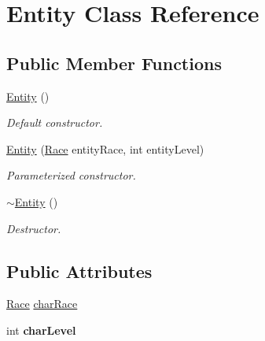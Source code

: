 \hypertarget{class_entity}{}\section{Entity Class Reference}
\label{class_entity}
\subsection*{Public Member Functions}
\begin{DoxyCompactItemize}
\item 
\hypertarget{class_entity_a980f368aa07ce358583982821533a54a}{}\label{class_entity_a980f368aa07ce358583982821533a54a} 
\hyperlink{class_entity_a980f368aa07ce358583982821533a54a}{Entity} ()
\begin{DoxyCompactList}\small\item\em Default constructor. \end{DoxyCompactList}\item 
\hypertarget{class_entity_aaed442bc1dcf2d646827d8fd117e52d4}{}\label{class_entity_aaed442bc1dcf2d646827d8fd117e52d4} 
\hyperlink{class_entity_aaed442bc1dcf2d646827d8fd117e52d4}{Entity} (\hyperlink{_entity_8h_aa2df4028f474807638d438104900b003}{Race} entity\+Race, int entity\+Level)
\begin{DoxyCompactList}\small\item\em Parameterized constructor. \end{DoxyCompactList}\item 
\hypertarget{class_entity_adf6d3f7cb1b2ba029b6b048a395cc8ae}{}\label{class_entity_adf6d3f7cb1b2ba029b6b048a395cc8ae} 
\hyperlink{class_entity_adf6d3f7cb1b2ba029b6b048a395cc8ae}{$\sim$\+Entity} ()
\begin{DoxyCompactList}\small\item\em Destructor. \end{DoxyCompactList}\end{DoxyCompactItemize}
\subsection*{Public Attributes}
\begin{DoxyCompactItemize}
\item 
\hyperlink{_entity_8h_aa2df4028f474807638d438104900b003}{Race} \hyperlink{class_entity_af1e600508552c74e578dc3258e2175c5}{char\+Race}
\item 
\hypertarget{class_entity_a11fbdfd2a23eab5ca33cbe051960b5c9}{}\label{class_entity_a11fbdfd2a23eab5ca33cbe051960b5c9} 
int {\bfseries char\+Level}
\end{DoxyCompactItemize}


